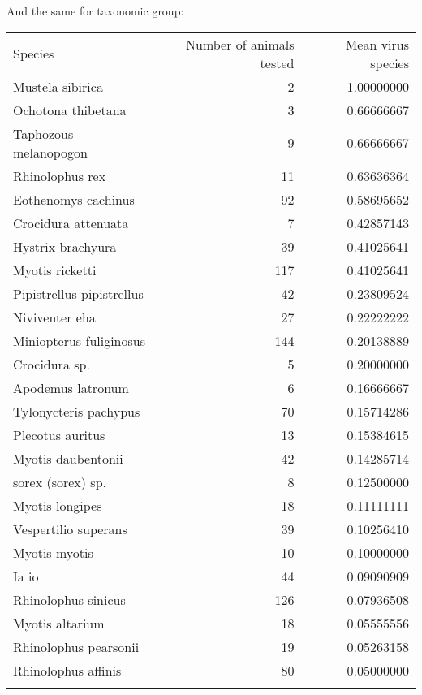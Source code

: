 \documentclass[11pt,article,oneside]{article}
\begin{document}
And the same for taxonomic group:

\begin{longtable}[c]{@{}lrr@{}}
\toprule\addlinespace
Species & Number of animals tested & Mean virus species
\\\addlinespace
\midrule\endhead
Mustela sibirica & 2 & 1.00000000
\\\addlinespace
Ochotona thibetana & 3 & 0.66666667
\\\addlinespace
Taphozous melanopogon & 9 & 0.66666667
\\\addlinespace
Rhinolophus rex & 11 & 0.63636364
\\\addlinespace
Eothenomys cachinus & 92 & 0.58695652
\\\addlinespace
Crocidura attenuata & 7 & 0.42857143
\\\addlinespace
Hystrix brachyura & 39 & 0.41025641
\\\addlinespace
Myotis ricketti & 117 & 0.41025641
\\\addlinespace
Pipistrellus pipistrellus & 42 & 0.23809524
\\\addlinespace
Niviventer eha & 27 & 0.22222222
\\\addlinespace
Miniopterus fuliginosus & 144 & 0.20138889
\\\addlinespace
Crocidura sp. & 5 & 0.20000000
\\\addlinespace
Apodemus latronum & 6 & 0.16666667
\\\addlinespace
Tylonycteris pachypus & 70 & 0.15714286
\\\addlinespace
Plecotus auritus & 13 & 0.15384615
\\\addlinespace
Myotis daubentonii & 42 & 0.14285714
\\\addlinespace
sorex (sorex) sp. & 8 & 0.12500000
\\\addlinespace
Myotis longipes & 18 & 0.11111111
\\\addlinespace
Vespertilio superans & 39 & 0.10256410
\\\addlinespace
Myotis myotis & 10 & 0.10000000
\\\addlinespace
Ia io & 44 & 0.09090909
\\\addlinespace
Rhinolophus sinicus & 126 & 0.07936508
\\\addlinespace
Myotis altarium & 18 & 0.05555556
\\\addlinespace
Rhinolophus pearsonii & 19 & 0.05263158
\\\addlinespace
Rhinolophus affinis & 80 & 0.05000000
\\\addlinespace

\end{longtable}
\end{document}
